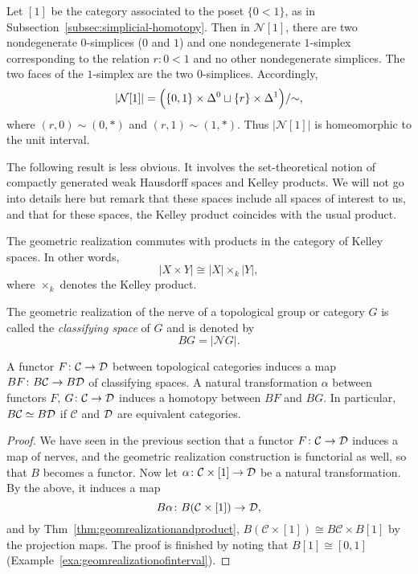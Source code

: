 \documentclass[a4paper,openany]{scrbook}
\renewcommand{\C}{\mathcal C}
\newcommand{\nerve}{\mathcal N}
\begin{document}
\begin{example}\label{exa:geomrealizationofinterval}
Let $[1]$ be the category associated to the poset $\{0 < 1\}$, as in Subsection~\ref{subsec:simplicial-homotopy}. Then in $\nerve [1]$, there are two nondegenerate $0$-simplices ($0$ and $1$) and one nondegenerate $1$-simplex corresponding to the relation $r\colon 0 < 1$ and no other nondegenerate simplices. The two faces of the $1$-simplex are the two $0$-simplices. Accordingly,
\[
|\nerve [1]| = \Bigl(\{0,1\} \times \Delta^0 \sqcup \{r\} \times \Delta^1\Bigr)/\mathord{\sim},
\]
where $(r,0) \sim (0,*)$ and $(r,1) \sim (1,*)$. Thus $|\nerve [1]|$ is homeomorphic to the unit interval.
\end{example}

The following result is less obvious. It involves the set-theoretical notion of compactly generated weak Hausdorff spaces and Kelley products. We will not go into details here but remark that these spaces include all spaces of interest to us, and that for these spaces, the Kelley product coincides with the usual product. 
\begin{thm} \label{thm:geomrealizationandproduct}
The geometric realization commutes with products in the category of Kelley spaces. In other words,
\[
| X \times Y | \cong |X| \times_k |Y|,
\]
where $\times_k$ denotes the Kelley product.
\end{thm}

\begin{defn}
The geometric realization of the nerve of a topological group or category $G$ is called the \emph{classifying space} of $G$ and is denoted by
\[
BG = |\nerve G|.
\]
\end{defn}



\begin{lemma}\label{lemma:classifyinghomotopy}
A functor $F\colon \C \to \D$ between topological categories induces a map $BF\colon B\C \to B\D$ of classifying spaces. A natural transformation $\alpha$ between functors $F$, $G\colon \C \to \D$ induces a homotopy between $BF$ and $BG$. In particular, $B\C \simeq B\D$ if $\C$ and $\mathcal D$ are equivalent categories.
\end{lemma}
\begin{proof}
We have seen in the previous section that a functor $F\colon \C \to \D$ induces a map of nerves, and the geometric realization construction is functorial as well, so that $B$ becomes a functor. Now let $\alpha\colon \C \times [1] \to \D$ be a natural transformation. By the above, it induces a map
\[
B\alpha\colon B(\C \times [1]) \to \D,
\]
and by Thm~\ref{thm:geomrealizationandproduct}, $B(\C \times [1]) \cong B\C \times B[1]$ by the projection maps. The proof is finished by noting that $B[1] \cong [0,1]$ (Example~\ref{exa:geomrealizationofinterval}).
\end{proof}
\end{document}
